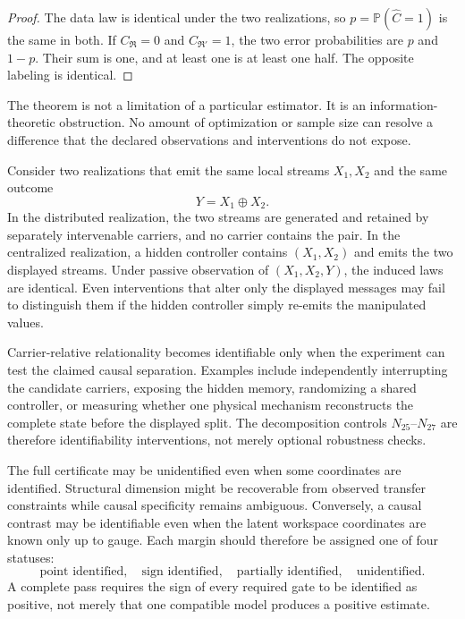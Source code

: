 \begin{proof}
The data law is identical under the two realizations, so
\(p=\mathbb P(\widehat C=1)\) is the same in both. If
\(C_{\mathfrak R}=0\) and \(C_{\mathfrak R'}=1\), the two error probabilities
are \(p\) and \(1-p\). Their sum is one, and at least one is at least one half.
The opposite labeling is identical.
\end{proof}

The theorem is not a limitation of a particular estimator. It is an
information-theoretic obstruction. No amount of optimization or sample size
can resolve a difference that the declared observations and interventions do
not expose.


Consider two realizations that emit the same local streams \(X_1,X_2\) and the
same outcome
\[
Y=X_1\oplus X_2.
\]
In the distributed realization, the two streams are generated and retained by
separately intervenable carriers, and no carrier contains the pair. In the
centralized realization, a hidden controller contains \((X_1,X_2)\) and emits
the two displayed streams. Under passive observation of
\((X_1,X_2,Y)\), the induced laws are identical. Even interventions that alter
only the displayed messages may fail to distinguish them if the hidden
controller simply re-emits the manipulated values.

Carrier-relative relationality becomes identifiable only when the experiment
can test the claimed causal separation. Examples include independently
interrupting the candidate carriers, exposing the hidden memory, randomizing a
shared controller, or measuring whether one physical mechanism reconstructs
the complete state before the displayed split. The decomposition controls
\(N_{25}\)--\(N_{27}\) are therefore identifiability interventions, not merely
optional robustness checks.


The full certificate may be unidentified even when some coordinates are
identified. Structural dimension might be recoverable from observed transfer
constraints while causal specificity remains ambiguous. Conversely, a causal
contrast may be identifiable even when the latent workspace coordinates are
known only up to gauge. Each margin should therefore be assigned one of four
statuses:
\[
\text{point identified},
\quad
\text{sign identified},
\quad
\text{partially identified},
\quad
\text{unidentified}.
\]
A complete pass requires the sign of every required gate to be identified as
positive, not merely that one compatible model produces a positive estimate.

